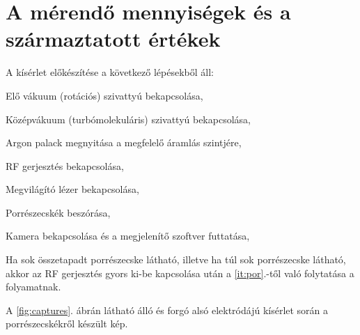 \clearpage

	
\section{A mérendő mennyiségek és a származtatott értékek}
	A kísérlet előkészítése a következő lépésekből áll:
	\begin{enumerate*}
		\item Elő vákuum (rotációs) szivattyú bekapcsolása,
		\item Középvákuum (turbómolekuláris) szivattyú bekapcsolása,
		\item Argon palack megnyitása a megfelelő áramlás szintjére,
		\item RF gerjesztés bekapcsolása,
		\item Megvilágító lézer bekapcsolása,
		\item \label{it:por} Porrészecskék beszórása,
		\item Kamera bekapcsolása és a megjelenítő szoftver futtatása,
		\item Ha sok összetapadt porrészecske látható, illetve ha túl sok porrészecske látható, akkor
		az RF gerjesztés gyors ki-be kapcsolása után a \ref{it:por}.-től való folytatása a folyamatnak.
	\end{enumerate*}
	A \ref{fig:captures}. ábrán látható álló és forgó alsó elektródájú kísérlet során a
	porrészecskékről készült kép.
	
